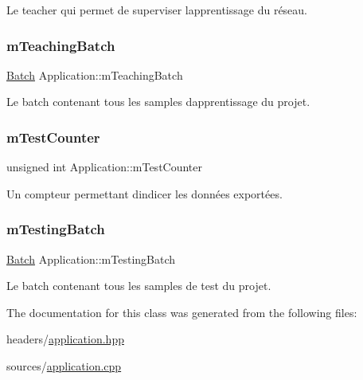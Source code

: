 Le teacher qui permet de superviser l\textquotesingle{}apprentissage du réseau. 

\mbox{\label{classApplication_a2ccd850b23693fd6d76cad0975a597dd}} 
\subsubsection{\texorpdfstring{m\+Teaching\+Batch}{mTeachingBatch}}
{\footnotesize\ttfamily \hyperlink{classApplication_a9888f02149ca3b8ffa499ee07426cd1d}{Batch} Application\+::m\+Teaching\+Batch\hspace{0.3cm}{\ttfamily [private]}}



Le batch contenant tous les samples d\textquotesingle{}apprentissage du projet. 

\mbox{\label{classApplication_a3ee8257a9c7ece037ee91b68d9841002}} 
\subsubsection{\texorpdfstring{m\+Test\+Counter}{mTestCounter}}
{\footnotesize\ttfamily unsigned int Application\+::m\+Test\+Counter\hspace{0.3cm}{\ttfamily [private]}}



Un compteur permettant d\textquotesingle{}indicer les données exportées. 

\mbox{\label{classApplication_a765dbdcf8fa110557c67fb78cffaceb3}} 
\subsubsection{\texorpdfstring{m\+Testing\+Batch}{mTestingBatch}}
{\footnotesize\ttfamily \hyperlink{classApplication_a9888f02149ca3b8ffa499ee07426cd1d}{Batch} Application\+::m\+Testing\+Batch\hspace{0.3cm}{\ttfamily [private]}}



Le batch contenant tous les samples de test du projet. 



The documentation for this class was generated from the following files\+:\begin{DoxyCompactItemize}
\item 
headers/\hyperlink{application_8hpp}{application.\+hpp}\item 
sources/\hyperlink{application_8cpp}{application.\+cpp}\end{DoxyCompactItemize}
